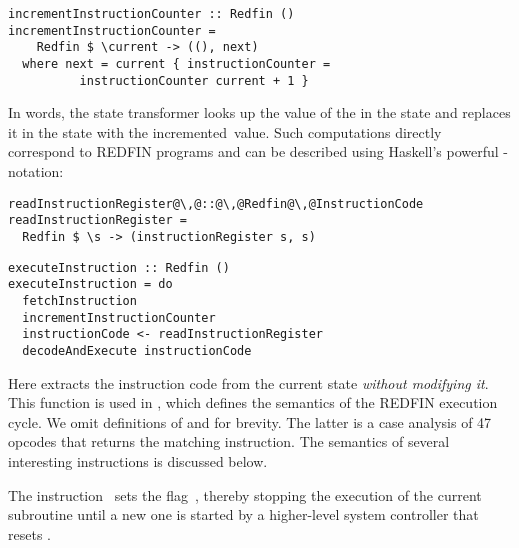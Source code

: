 \begin{verbatim}
incrementInstructionCounter :: Redfin ()
incrementInstructionCounter =
    Redfin $ \current -> ((), next)
  where next = current { instructionCounter =
          instructionCounter current + 1 }
\end{verbatim}

\noindent
In words, the state transformer looks up the value of the 
in the  state and replaces it in the  state with the
incremented~value. Such computations directly correspond to REDFIN programs and
can be described using Haskell's powerful -notation:



\begin{verbatim}
readInstructionRegister@\,@::@\,@Redfin@\,@InstructionCode
readInstructionRegister =
  Redfin $ \s -> (instructionRegister s, s)
\end{verbatim}
\vspace{0.5mm}
\begin{verbatim}
executeInstruction :: Redfin ()
executeInstruction = do
  fetchInstruction
  incrementInstructionCounter
  instructionCode <- readInstructionRegister
  decodeAndExecute instructionCode
\end{verbatim}

\noindent
Here  extracts the instruction code from the current
state \emph{without modifying it}. This function is used in ,
which defines the semantics of the REDFIN execution cycle. We omit definitions of
 and  for brevity. The latter is a
case analysis of 47 opcodes that returns the matching instruction. The semantics
of several interesting instructions is discussed below.

The instruction~ sets the flag~, thereby stopping the
execution of the current subroutine until a new one is started by a higher-level
system controller that resets .

